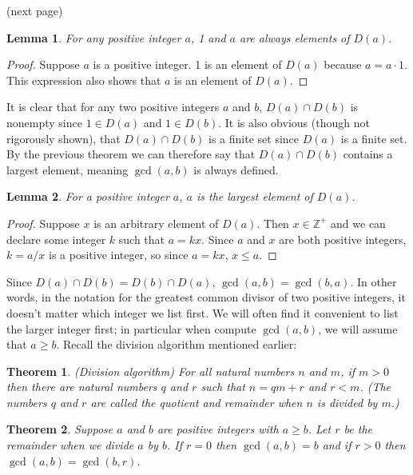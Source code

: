 \documentclass{report}
\newtheorem*{theorem}{Theorem}
\newtheorem*{lemma}{Lemma}
\theoremstyle{definition}
\begin{document}
\noindent(next page)
\newpage
\begin{lemma}
For any positive integer $a$, 1 and $a$ are always elements of $D(a)$. 
\end{lemma}
\begin{proof}
Suppose $a$ is a positive integer. 1 is an element of $D(a)$ because $a=a\cdot 1$. This expression also shows that $a$ is an element of $D(a)$.
\end{proof}
\noindent It is clear that for any two positive integers $a$ and $b$, $D(a)\cap D(b)$ is nonempty since $1\in D(a)$ and $1\in D(b)$. It is also obvious (though not rigorously shown), that
$D(a)\cap D(b)$ is a finite set since $D(a)$ is a finite set. By the previous theorem we can therefore say that $D(a)\cap D(b)$ contains a largest element, meaning $\gcd(a,b)$ is always defined.
\begin{lemma}
For a positive integer $a$, $a$ is the largest element of $D(a)$.
\end{lemma}
\begin{proof}
Suppose $x$ is an arbitrary element of $D(a)$. Then $x\in\mathbb Z^+$ and we can declare some integer $k$ such that $a=kx$. Since $a$ and $x$ are both positive integers, $k=a/x$ is a positive
integer, so since $a=kx$, $x\leq a$.
\end{proof}
\noindent Since $D(a)\cap D(b)=D(b)\cap D(a)$, $\gcd(a,b)=\gcd(b,a)$. In other words, in the notation for the greatest common divisor of two positive integers,
it doesn't matter which integer we list first. We will often find it convenient to list the larger integer first; in particular when compute $\gcd(a,b)$, we will assume that $a\geq b$.
Recall the division algorithm mentioned earlier:
\begin{theorem}
(Division algorithm) For all natural numbers $n$ and $m$, if $m>0$ then there are natural numbers $q$ and $r$ such that $n=qm+r$ and $r<m$. (The numbers $q$ and $r$ are called the quotient
and remainder when $n$ is divided by $m$.)
\end{theorem}
\begin{theorem}
Suppose $a$ and $b$ are positive integers with $a\geq b$. Let $r$ be the remainder when we divide $a$ by $b$. If $r=0$ then $\gcd(a,b)=b$ and if $r>0$ then $\gcd(a,b)=\gcd(b,r)$.
\end{theorem}
\end{document}
